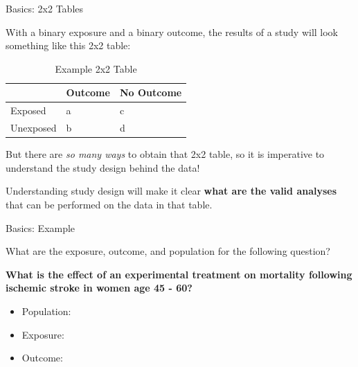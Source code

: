 \documentclass[ignorenonframetext,]{beamer}
\providecommand{\tightlist}{%
  \setlength{\itemsep}{0pt}\setlength{\parskip}{0pt}}
\begin{document}
\begin{frame}{Basics: 2x2 Tables}
\protect\hypertarget{basics-2x2-tables}{}

With a binary exposure and a binary outcome, the results of a study will
look something like this 2x2 table:

\begin{table}[!h]

\caption{\label{tab:table3}Example 2x2 Table}
\centering
\begin{tabular}{l|l|l}
\hline
 & Outcome & No Outcome\\
\hline
Exposed & a & c\\
\hline
Unexposed & b & d\\
\hline
\end{tabular}
\end{table}

But there are \emph{so many ways} to obtain that 2x2 table, so it is
imperative to understand the study design behind the data!

Understanding study design will make it clear \textbf{what are the valid
analyses} that can be performed on the data in that table.

\end{frame}

\begin{frame}{Basics: Example}
\protect\hypertarget{basics-example}{}

What are the exposure, outcome, and population for the following
question?

\textbf{What is the effect of an experimental treatment on mortality
following ischemic stroke in women age 45 - 60?}

\begin{itemize}
\tightlist
\item
  Population:
\item
  Exposure:
\item
  Outcome:
\end{itemize}

\end{frame}
\end{document}
